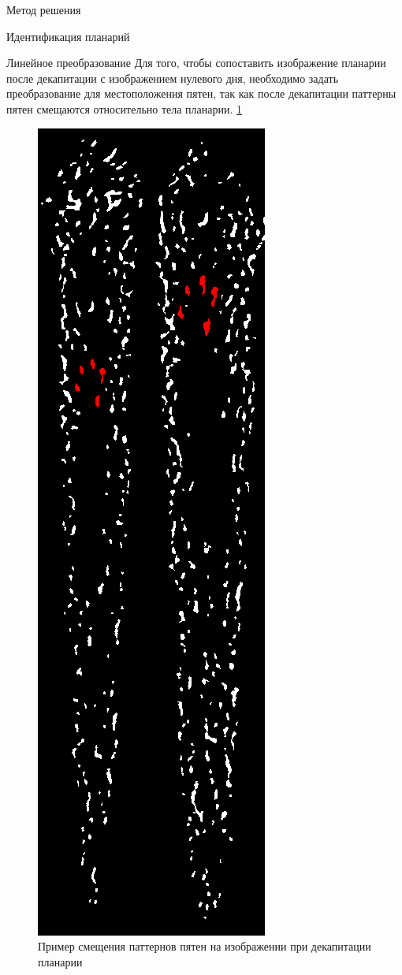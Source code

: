 \documentclass{article}
\begin{document}
\begin{section}{Метод решения}
\begin{subsection}{Идентификация планарий}
\begin{subsubsection}{Линейное преобразование}
Для того, чтобы сопоставить изображение планарии после декапитации с изображением нулевого дня, необходимо задать преобразование для местоположения пятен, так как после декапитации паттерны пятен смещаются относительно тела планарии. \ref{fig5}
\begin{figure}[H]
\centering
\includegraphics[scale=0.3]{linear.png}
\caption{Пример смещения паттернов пятен на изображении при декапитации планарии}
\label{fig5}
\end{figure}


\end{subsubsection}
\end{subsection}
\end{section}
\end{document}

